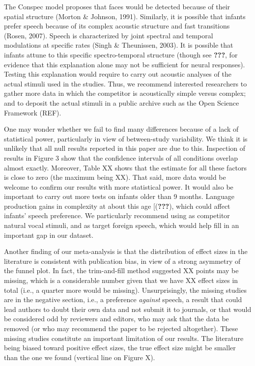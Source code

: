 \documentclass[man]{apa6}
\begin{document}
The Conspec model proposes that faces would be detected because of their
spatial structure (Morton \& Johnson, 1991). Similarly, it is possible
that infants prefer speech because of its complex acoustic structure and
fast transitions (Rosen, 2007). Speech is characterized by joint
spectral and temporal modulations at specific rates (Singh \&
Theunissen, 2003). It is possible that infants attune to this specific
spectro-temporal structure (though see {\textbf{???}}, for evidence that
this explanation alone may not be sufficient for neural responses).
Testing this explanation would require to carry out acoustic analyses of
the actual stimuli used in the studies. Thus, we recommend interested
researchers to gather more data in which the competitor is acoustically
simple versus complex; and to deposit the actual stimuli in a public
archive such as the Open Science Framework (REF).

One may wonder whether we fail to find many differences because of a
lack of statistical power, particularly in view of between-study
variability. We think it is unlikely that all null results reported in
this paper are due to this. Inspection of results in Figure 3 show that
the confidence intervals of all conditions overlap almost exactly.
Moreover, Table XX shows that the estimate for all these factors is
close to zero (the maximum being XX). That said, more data would be
welcome to confirm our results with more statistical power. It would
also be important to carry out more tests on infants older than 9
months. Language production gains in complexity at about this age
{[}({\textbf{???}}), which could affect infants' speech preference. We
particularly recommend using as competitor natural vocal stimuli, and as
target foreign speech, which would help fill in an important gap in our
dataset.

Another finding of our meta-analysis is that the distribution of effect
sizes in the literature is consistent with publication bias, in view of
a strong asymmetry of the funnel plot. In fact, the trim-and-fill method
suggested XX points may be missing, which is a considerable number given
that we have XX effect sizes in total (i.e., a quarter more would be
missing). Unsurprisingly, the missing studies are in the negative
section, i.e., a preference \emph{against} speech, a result that could
lead authors to doubt their own data and not submit it to journals, or
that would be considered odd by reviewers and editors, who may ask that
the data be removed (or who may recommend the paper to be rejected
altogether). These missing studies constitute an important limitation of
our results. The literature being biased toward positive effect sizes,
the true effect size might be smaller than the one we found (vertical
line on Figure X).
\end{document}
